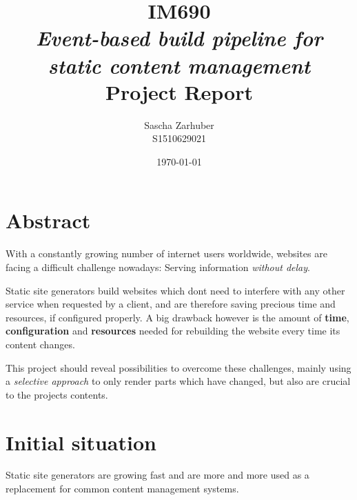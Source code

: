 \documentclass[a4paper,english,11pt]{report}
\author{Sascha Zarhuber\\ S1510629021}
\title{IM690\\ \emph{Event-based build pipeline for static content management}\\ Project Report}
\date{\today}
\begin{document}
\maketitle
\tableofcontents

\chapter*{Abstract} %

With a constantly growing number of internet users worldwide, websites are facing a difficult challenge nowadays: Serving information \emph{without delay}.

Static site generators build websites which don\textquotesingle t need to interfere with any other service when requested by a client, and are therefore saving precious time and resources, if configured properly. A big drawback however is the amount of \textbf{time}, \textbf{configuration} and \textbf{resources} needed for rebuilding the website every time its content changes.

This project should reveal possibilities to overcome these challenges, mainly using a \emph{selective approach} to only render parts which have changed, but also are crucial to the project\textquotesingle s contents.


\chapter{Initial situation}

Static site generators are growing fast and are more and more used as a replacement for common content management systems.
\end{document}
